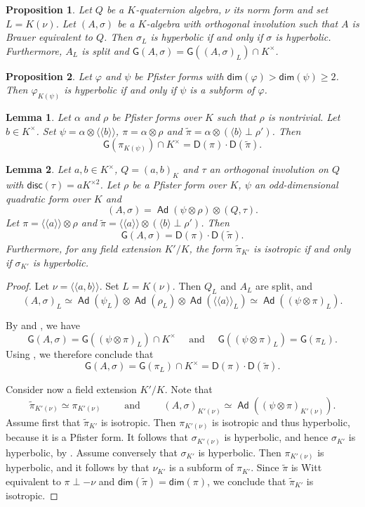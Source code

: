 \documentclass[10pt,a4paper]{amsart}
\newtheorem{prop}{Proposition}
\newtheorem{lem}{Lemma}
\newcommand\Ad{\operatorname{\mathsf{Ad}}}
\newcommand{\D}{\mathsf{D}}
\newcommand{\G}{\mathsf{G}}
\renewcommand{\dim}{\mathsf{dim}}
\newcommand{\disc}{\mathsf{disc}}
\renewcommand{\geq}{\geqslant}
\newcommand{\la}{\langle}
\newcommand{\lla}{\la\!\la}
\newcommand{\mg}[1]{{#1}^{\times}}
\newcommand{\ra}{\rangle}
\newcommand{\rra}{\ra\!\ra}
\newcommand{\s}{\sigma}
\newcommand{\sq}[1]{{#1}^{\times 2}}
\newcommand{\vf}{\varphi}
\newcommand{\wt}{\widetilde}
\begin{document}
\begin{prop}\label{simsplitreduction}
Let $Q$ be a $K$-quaternion algebra, $\nu$ its norm form and set $L=K(\nu)$.
Let $(A,\s)$ be a $K$-algebra with orthogonal involution such that $A$ is Brauer equivalent to $Q$.
Then $\s_L$ is hyperbolic if and only if $\s$ is hyperbolic.
Furthermore, $A_{L}$ is split and $\G(A,\s)=\G((A,\s)_{L})\cap \mg{K}$.
\end{prop}

\begin{prop}\label{Pfister-subform}
    Let $\vf$ and $\psi$ be Pfister forms with $\dim(\vf)>\dim(\psi)\geq 2$.
    Then $\vf_{K(\psi)}$ is hyperbolic if and only if $\psi$ is a subform of $\vf$.
\end{prop}

\begin{lem}\label{L:Pfister-fufi-G}
    Let $\alpha$ and $\rho$ be Pfister forms over $K$ such that $\rho$ is nontrivial. Let $b\in\mg{K}$. 
    Set $\psi=\alpha\otimes \lla b\rra$, $\pi=\alpha\otimes\rho$ and $\wt{\pi}=\alpha\otimes (\la b\ra\perp\rho')$.
    Then \[\G(\pi_{K(\psi)})\cap\mg{K}=\D(\pi)\cdot\D(\wt{\pi}).\]
\end{lem}

\begin{lem}\label{ad}
Let $a,b\in\mg{K}$, $Q=(a,b)_K$ and $\tau$ an orthogonal involution on $Q$ with $\disc(\tau)=a\sq{K}$.
Let $\rho$ be a Pfister form over $K$, $\psi$ an odd-dimensional quadratic form over $K$ and $$(A,\s)=\Ad(\psi\otimes\rho)\otimes (Q,\tau).$$
Let $\pi=\lla a\rra\otimes \rho$ and $\wt{\pi}=\lla a\rra\otimes (\la b\ra\perp\rho')$.
Then $$\G(A,\s)=\D(\pi)\cdot \D(\wt{\pi}).$$
    Furthermore, for any field extension $K'/K$, the form $\wt{\pi}_{K'}$ is isotropic if and only if $\s_{K'}$ is hyperbolic.
    \end{lem}

\begin{proof}
Let $\nu= \lla a,b\rra$. Set $L=K(\nu)$.
Then $Q_{L}$ and $A_{L}$ are split, and 
\[(A,\s)_{L}\simeq \Ad(\psi_L)\otimes\Ad(\rho_{L})\otimes\Ad(\lla a\rra_{L})\simeq \Ad((\psi\otimes\pi)_{L}).\]

By  and , we have
\[\G(A,\s)=\G((\psi\otimes \pi)_L)\cap \mg{K}\quad\text{ and 
}\quad\G((\psi\otimes\pi)_{L})=\G(\pi_{L}).\]
Using , we therefore conclude that 
\[\G(A,\s)=\G(\pi_{L})\cap\mg{K}=\D(\pi)\cdot \D(\wt{\pi}).\]

Consider now a field extension $K'/K$.
Note that 
\[\wt{\pi}_{K'(\nu)}\simeq \pi_{K'(\nu)}\qquad\text{ and }\qquad(A,\s)_{K'(\nu)}\simeq \Ad((\psi\otimes\pi)_{K'(\nu)}).\]
Assume first that $\wt{\pi}_{K'}$ is isotropic.
Then $\pi_{K'(\nu)}$ is isotropic and thus hyperbolic, because it is a Pfister form. 
It follows that $\s_{K'(\nu)}$ is hyperbolic, and hence $\s_{K'}$ is hyperbolic, by .
Assume conversely that $\s_{K'}$ is hyperbolic.
Then $\pi_{K'(\nu)}$ is hyperbolic, and it follows by  that $\nu_{K'}$ is a subform of $\pi_{K'}$.
Since $\wt{\pi}$ is Witt equivalent to $\pi\perp-\nu$ and $\dim(\wt{\pi})=\dim(\pi)$, we conclude that $\wt{\pi}_{K'}$ is isotropic.
\end{proof}
\end{document}
